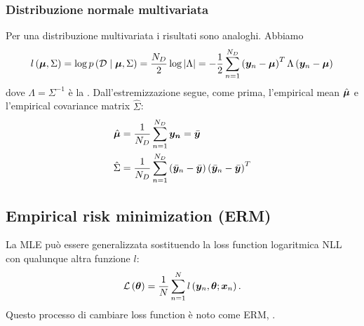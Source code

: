 \documentclass[10pt]{article}
\newcommand{\HALF}{\frac{1}{2}}
\newcommand{\pare}[1]{
	\ensuremath{\left(#1\right)}
}
\begin{document}
\subsubsection{Distribuzione normale multivariata}
Per una distribuzione multivariata i risultati sono analoghi. Abbiamo
\begin{equation}
l\pare{\ve{\mu}, \Sigma} = \log p\pare{\mathcal{D}\cond\ve{\mu},\Sigma} = \frac{N_D}{2}\log\left|\Lambda\right| = -\HALF\sum_{n=1}^{N_D}\pare{\ve{y}_n - \ve{\mu}}^T \Lambda\pare{\ve{y}_n - \ve{\mu}}
\end{equation}
dove $\Lambda = \Sigma^{-1}$ è la . Dall'estremizzazione
segue, come prima, l'empirical mean $\hat{\bm{\mu}}$ e l'empirical covariance
matrix $\hat{\Sigma}$:
\begin{align}
\hat{\ve{\mu}} &= \frac{1}{N_D}\sum_{n=1}^{N_D}\ve{y_n} = \bar{\ve{y}} \\
\hat{\Sigma} &= \frac{1}{N_D}\sum_{n=1}^{N_D}\pare{\bar{\ve{y}}_n - \bar{\ve{y}}}\pare{\bar{\ve{y}}_n - \bar{\ve{y}}}^T 
\end{align}

\subsection{Empirical risk minimization (ERM)}
La MLE può essere generalizzata sostituendo la loss function logaritmica NLL con qualunque altra funzione $l$:
\begin{equation}
\mathcal{L}\pare{\ve{\theta}} = \frac{1}{N}\sum_{n=1}^N l\pare{\ve{y}_n, \ve{\theta}; \ve{x}_n}.
\end{equation}
Questo processo di cambiare loss function è noto come ERM, . %
\end{document}
